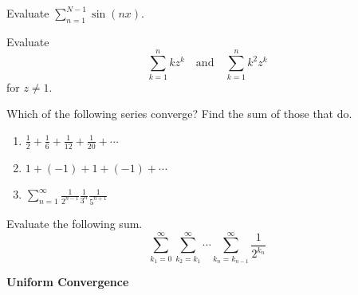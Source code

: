 {\begin{Exercise}
\end{Exercise}



\begin{Exercise}
  \label{exercise sum sin nx}
  Evaluate $\sum_{n=1}^{N-1} \sin(n x)$.

\end{Exercise}


\begin{Exercise}
  \label{exercise sum k z^k}
  Evaluate
  \[
  \sum_{k=1}^n k z^k \quad \mathrm{and} \quad \sum_{k=1}^n k^2 z^k
  \]
  for $z \neq 1$.

\end{Exercise}


\begin{Exercise}
  \label{exercise sum rational alternate geometric}
  Which of the following series converge?  Find the sum of those that do.
  \begin{enumerate}
  \item 
    $\displaystyle \frac{1}{2} + \frac{1}{6} + \frac{1}{12}
    + \frac{1}{20} + \cdots$
  \item 
    $\displaystyle 1 + (-1) + 1 + (-1) + \cdots$
  \item 
    $\displaystyle \sum_{n = 1}^\infty \frac{1}{2^{n-1}} \frac{1}{3^n} \frac{1}{5^{n+1}}$
  \end{enumerate}

\end{Exercise}








\begin{Exercise}
  \label{exercise sum sum 1/2 k}
  Evaluate the following sum.
  \[
  \sum_{k_1 = 0}^\infty \sum_{k_2 = k_1}^\infty \cdots \sum_{k_n = k_{n-1}}^\infty \frac{1}{2^{k_n}}
  \]

\end{Exercise}



\begin{large}
  \noindent
  \textbf{Uniform Convergence}
\end{large}



}
